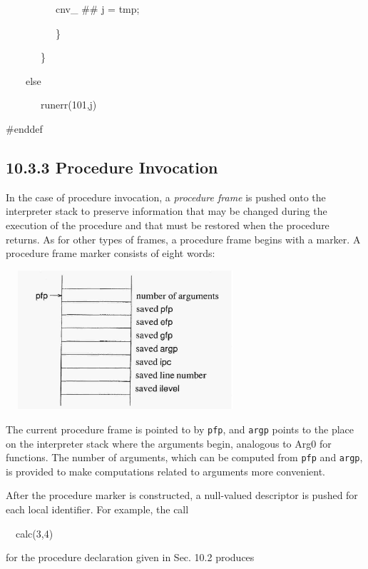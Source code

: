 {\ttfamily\mdseries
\ \ \ \ \ \ \ \ \ \ cnv\_ \#\# j = tmp;}

{\ttfamily\mdseries
\ \ \ \ \ \ \ \ \ \ \}}

{\ttfamily\mdseries
\ \ \ \ \ \ \ \}}

{\ttfamily\mdseries
\ \ \ \ else}

{\ttfamily\mdseries
\ \ \ \ \ \ \ runerr(101,j)}

{\ttfamily\mdseries
\#enddef}

\subsection[10.3.3 Procedure Invocation]{10.3.3 Procedure Invocation}

In the case of procedure invocation, a \textit{procedure frame} is
pushed onto the interpreter stack to preserve information that may be
changed during the execution of the procedure and that must be
restored when the procedure returns. As for other types of frames, a
procedure frame begins with a marker. A procedure frame marker
consists of eight words:


\ \  \includegraphics[width=3.2063in,height=2.0272in]{ib-img/ib-img084.jpg} 


The current procedure frame is pointed to by \texttt{pfp}, and
\texttt{argp} points to the place on the interpreter stack where the
arguments begin, analogous to Arg0 for functions. The number of
arguments, which can be computed from \texttt{pfp} and \texttt{argp},
is provided to make computations related to arguments more convenient.

After the procedure marker is constructed, a null-valued descriptor is
pushed for each local identifier. For example, the call

{\ttfamily\mdseries
\ \ calc(3,4)}

\noindent for the procedure declaration given in Sec. 10.2 produces


